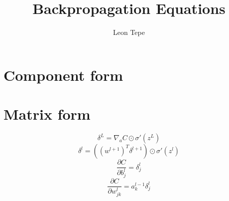 \documentclass{article}
\title{Backpropagation Equations}
\author{Leon Tepe}
\date{}
\begin{document}
    \maketitle

    \section{Component form}

    \section{Matrix form}
    \begin{equation}
        \delta^{L} = \nabla_a C \odot \sigma' (z^{L})
    \end{equation}
    \begin{equation}
        \delta^l = ((w^{l+1})^T \delta^{l+1}) \odot \sigma'(z^l)
    \end{equation}
    \begin{equation}
        \frac{\partial C}{\partial b_j^l} = \delta_j^l
    \end{equation}
    \begin{equation}
        \frac{\partial C}{\partial w^l_{jk}} = a_k^{l-1} \delta_j^l
    \end{equation}
\end{document}
